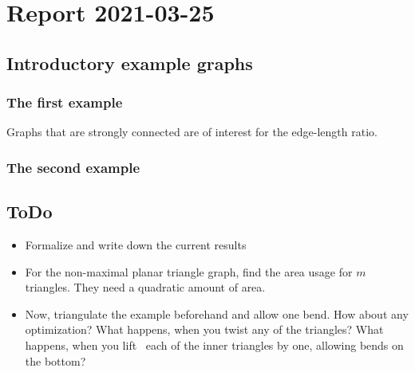 \section{Report 2021-03-25}
\subsection{Introductory example graphs}
\subsubsection{The first example}
Graphs that are strongly connected are of interest for the edge-length ratio. 
\subsubsection{The second example}
\subsection{ToDo}
\begin{itemize}
	\item Formalize and write down the current results
	\item For the non-maximal planar triangle graph, find the area usage for $m$ triangles. They need a quadratic amount of area.
	\item Now, triangulate the example beforehand and allow one bend. How about any optimization? What happens, when you twist any of the triangles? What happens, when you \grqq lift\grqq~ each of the inner triangles by one, allowing bends on the bottom?
\end{itemize}